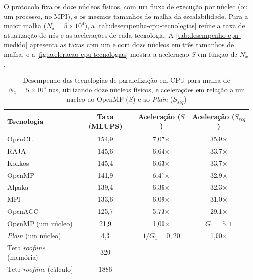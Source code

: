 O protocolo fixa os doze núcleos físicos, com um fluxo de execução por núcleo (ou um processo, no MPI), e os mesmos tamanhos de malha da escalabilidade.
Para a maior malha (\(N_x=5\times10^4\)), a \autoref{tab:desempenho-cpu-tecnologias} reúne a taxa de atualização de nós e as acelerações de cada tecnologia.
A \autoref{tab:desempenho-cpu-medido} apresenta as taxas com um e com doze núcleos em três tamanhos de malha, e a \autoref{fig:aceleracao-cpu-tecnologias} mostra a aceleração \(S\) em função de \(N_x\).

\begin{table}[H]
    \centering
    \caption{Desempenho das tecnologias de paralelização em CPU para malha de \(N_x=5\times10^4\) nós, utilizando doze núcleos físicos, e acelerações em relação a um núcleo do OpenMP (\(S\)) e ao \textit{Plain} (\(S_{seq}\))}
    \label{tab:desempenho-cpu-tecnologias}
    \footnotesize
    \begin{tabular}{lccc}
        \toprule
        Tecnologia & Taxa (MLUPS) & Aceleração (\(S\)) & Aceleração (\(S_{seq}\)) \\
        \midrule
        OpenCL & 154{,}9 & 7{,}07\(\times\) & 35{,}9\(\times\) \\
        RAJA & 145{,}6 & 6{,}64\(\times\) & 33{,}7\(\times\) \\
        Kokkos & 145{,}4 & 6{,}63\(\times\) & 33{,}7\(\times\) \\
        OpenMP & 141{,}9 & 6{,}47\(\times\) & 32{,}9\(\times\) \\
        Alpaka & 139{,}4 & 6{,}36\(\times\) & 32{,}3\(\times\) \\
        MPI & 133{,}6 & 6{,}09\(\times\) & 31{,}0\(\times\) \\
        OpenACC & 125{,}7 & 5{,}73\(\times\) & 29{,}1\(\times\) \\
        \midrule
        OpenMP (um núcleo) & 21{,}9 & 1{,}00\(\times\) & \(G_1 = 5{,}1\) \\
        \textit{Plain} (um núcleo) & 4{,}3 & \(1/G_1 = 0{,}20\) & 1{,}00\(\times\) \\
        \midrule
        Teto \textit{roofline} (memória) & 320 & --- & --- \\
        Teto \textit{roofline} (cálculo) & 1886 & --- & --- \\
        \bottomrule
    \end{tabular}
\end{table}

